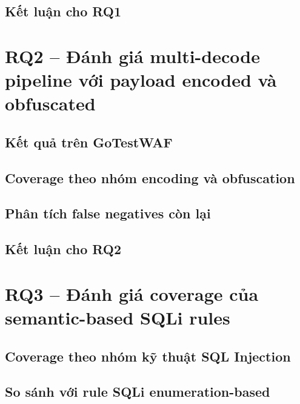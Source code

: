 \subsection{Kết luận cho RQ1}
\label{subsec:rq1-conclusion}

\section{RQ2 -- Đánh giá multi-decode pipeline với payload encoded và obfuscated}
\label{sec:rq2-decode-pipeline-results}

\subsection{Kết quả trên GoTestWAF}
\label{subsec:rq2-gotestwaf-results}

\subsection{Coverage theo nhóm encoding và obfuscation}
\label{subsec:rq2-technique-coverage}

\subsection{Phân tích false negatives còn lại}
\label{subsec:rq2-false-negatives-analysis}

\subsection{Kết luận cho RQ2}
\label{subsec:rq2-conclusion}

\section{RQ3 -- Đánh giá coverage của semantic-based SQLi rules}
\label{sec:rq3-semantic-sqli-coverage}

\subsection{Coverage theo nhóm kỹ thuật SQL Injection}
\label{subsec:rq3-sqli-technique-coverage}

\subsection{So sánh với rule SQLi enumeration-based}
\label{subsec:rq3-enumeration-comparison}

